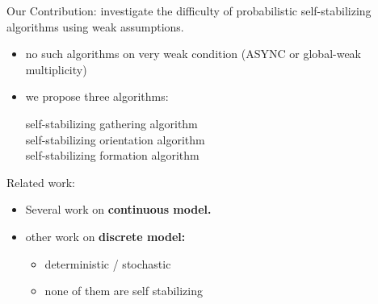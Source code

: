 \documentclass{beamer}
\begin{document}
\begin{frame}
	Our Contribution: investigate the difficulty of probabilistic self-stabilizing algorithms 
	using weak assumptions.
	\begin{itemize}
		\pause
		\item no such algorithms on very weak condition (ASYNC or global-weak multiplicity)
		\pause
		\item we propose three algorithms:
		\begin{description}
			\item[self-stabilizing gathering algorithm]
			\item[self-stabilizing orientation algorithm]
			\item[self-stabilizing formation algorithm]
		\end{description}  
	\end{itemize}
\end{frame}

\begin{frame}
	Related work:
	\begin{itemize}
		\pause
		\item Several work on \textbf{continuous model.} 
		\pause
		\item other work on \textbf{discrete model:}
		\begin{itemize}
			\pause
			\item deterministic / stochastic
			\pause
			\item none of them are self stabilizing
		\end{itemize}
	\end{itemize}
\end{frame}
\end{document}
